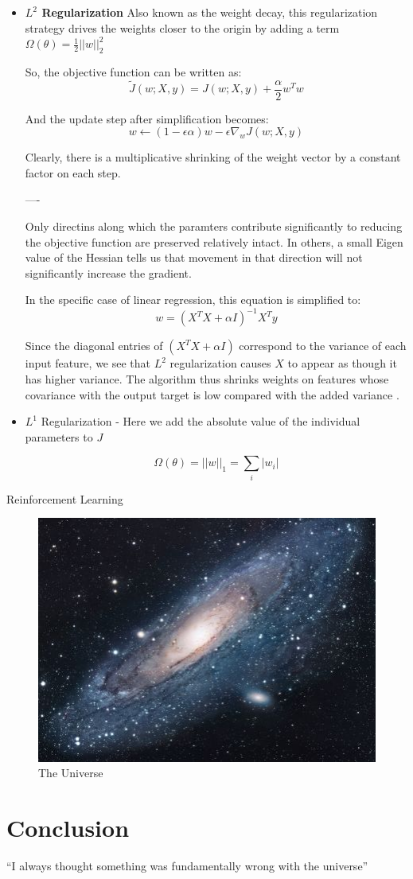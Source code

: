 \documentclass{article}
\begin{document}
\begin{itemize}
    \item \textbf{$L^2$ Regularization} Also known as the weight decay, this regularization strategy drives the weights closer to the origin by adding a term $ \Omega(\theta) = \frac{1}{2} || w ||^2_2$
    
    So, the objective function can be written as:
    $$ \tilde{J}(w; X, y) = J(w; X, y) + \frac{\alpha}{2}w^Tw $$
    
    And the update step after simplification becomes:
    $$ w \leftarrow (1 - \epsilon\alpha)w - \epsilon \nabla_wJ(w; X,y) $$
    
    Clearly, there is a multiplicative shrinking of the weight vector by a constant factor on each step.
    
    ----
    
    Only directins along which the paramters contribute significantly to reducing the objective function are preserved relatively intact. In others, a small Eigen value of the Hessian tells us that movement in that direction will not significantly increase the gradient.
    
    In the specific case of linear regression, this equation is simplified to:
    $$ w = (X^TX + \alpha I) ^{-1} X^T y $$
    
    Since the diagonal entries of $ (X^TX + \alpha I)$ correspond to the variance of each input feature, we see that $L^2$ regularization causes $X$ to appear as though it has higher variance. The algorithm thus shrinks weights on features whose covariance with the output target is low compared with the added variance .
    
    \item{$L^1$ Regularization} - Here we add the absolute value of the individual parameters to $J$
    
    $$ \Omega(\theta) = ||w||_1 = \sum_i|w_i| $$
    
    
    
\end{itemize}

Reinforcement Learning

\begin{figure}[h!]
\centering
\includegraphics[scale=1.7]{universe.jpg}
\caption{The Universe}
\label{fig:univerise}
\end{figure}

\section{Conclusion}
``I always thought something was fundamentally wrong with the universe'' \citep{adams1995hitchhiker}



\end{document}
